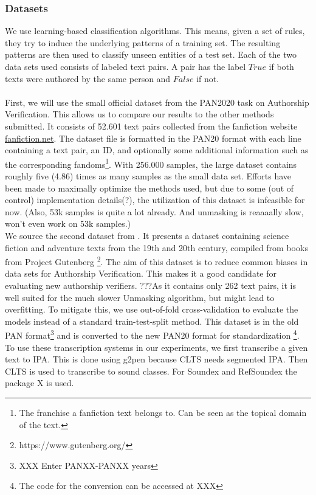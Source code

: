 \subsubsection{Datasets}
We use learning-based classification algorithms.
This means, given a set of rules, they try to induce the underlying patterns of a training set.
The resulting patterns are then used to classify unseen entities of a test set.
Each of the two data sets used consists of labeled text pairs.
A pair has the label $True$ if both texts were authored by the same person and $False$ if not.\\\\
First, we will use the small official dataset from the PAN2020 task on Authorship Verification.
This allows us to compare our results to the other methods submitted.
It consists of 52.601 text pairs collected from the fanfiction website \url{fanfiction.net}.
The dataset file is formatted in the PAN20 format with each line containing a text pair, an ID, and optionally some additional information such as the corresponding fandoms\footnote{The franchise a fanfiction text belongs to. Can be seen as the topical domain of the text.}.
With 256.000 samples, the large dataset contains roughly five (4.86) times as many samples as the small data set.
Efforts have been made to maximally optimize the methods used, but due to some (out of control) implementation details(?), the utilization of this dataset is infeasible for now. (Also, 53k samples is quite a lot already.
And unmasking is reaaaally slow, won't even work on 53k samples.)\\
We source the second dataset from \cite{stein2019unbiasedGutenbergCorpus}.
It presents a dataset containing science fiction and adventure texts from the 19th and 20th century, compiled from books from Project Gutenberg \footnote{https://www.gutenberg.org/}.
The aim of this dataset is to reduce common biases in data sets for Authorship Verification.
This makes it a good candidate for evaluating new authorship verifiers.
???As it contains only 262 text pairs, it is well suited for the much slower Unmasking algorithm, but might lead to overfitting.
To mitigate this, we use out-of-fold cross-validation to evaluate the models instead of a standard train-test-split method.
This dataset is in the old PAN format\footnote{XXX Enter PANXX-PANXX years} and is converted to the new PAN20 format for standardization \footnote{The code for the conversion can be accessed at XXX}.\\
To use these transcription systems in our experiments, we first transcribe a given text to IPA.
This is done using g2pen because CLTS needs segmented IPA.  %
Then CLTS is used to transcribe to sound classes.
For Soundex and RefSoundex the package X is used.


